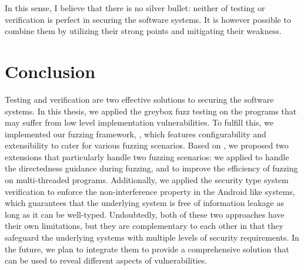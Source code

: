 In this sense, I believe that there is no silver bullet: neither of testing or verification is perfect in securing the software systems. It is however possible to combine them by utilizing their strong points and mitigating their weakness.


\section{Conclusion}\label{sec:conclusion}


Testing and verification are two effective solutions to securing the software systems. In this thesis, we applied the greybox fuzz testing on the programs that may suffer from low level implementation vulnerabilities. To fulfill this, we implemented our fuzzing framework, \FOT, which features configurability and extensibility to cater for various fuzzing scenarios. Based on \FOT, we proposed two extensions that particularly handle two fuzzing scenarios: we applied \dFOT to handle the directedness guidance during fuzzing, and \mtfuzz to improve the efficiency of fuzzing on multi-threaded programs. Additionally, we applied the security type system verification to enforce the non-interference property in the Android like systems, which guarantees that the underlying system is free of information leakage as long as it can be well-typed. Undoubtedly, both of these two approaches have their own limitations, but they are complementary to each other in that they safeguard the underlying systems with multiple levels of security requirements. In the future, we plan to integrate them to provide a comprehensive solution that can be used to reveal different aspects of vulnerabilities.
